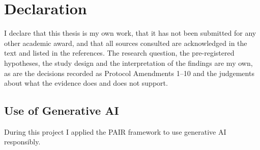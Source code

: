 %
\chapter*{Declaration}

I declare that this thesis is my own work, that it has not been submitted for
any other academic award, and that all sources consulted are acknowledged in
the text and listed in the references. The research question, the
pre-registered hypotheses, the study design and the interpretation of the
findings are my own, as are the decisions recorded as Protocol Amendments
1--10 and the judgements about what the evidence does and does not support.

\section*{Use of Generative AI}

During this project I applied the PAIR framework to use generative AI
responsibly.

